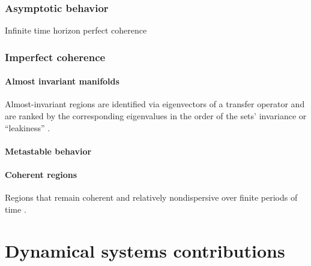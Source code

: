 \documentclass{article}
\theoremstyle{definition} \newtheorem{definition}{Definition}  \newtheorem{example}{Example}
\theoremstyle{remark} \newtheorem{remark}{Remark}
\newcounter{ct}
\begin{document}
\subsubsection{Asymptotic behavior}\label{sec:asymptotic}
Infinite time horizon perfect coherence





\subsubsection{Imperfect coherence}%
\paragraph{Almost invariant manifolds}
 Almost-invariant regions are identified via eigenvectors of a transfer operator and are ranked by the corresponding eigenvalues in the order of the sets' invariance or ``leakiness'' \citep{froyland2009almost}.
    
    
    
\paragraph{Metastable behavior}\label{sec:metastable}
   \citep{brinkman2022metastable}
    
    
\paragraph{Coherent regions}
Regions that remain coherent and relatively nondispersive over finite periods of time \citep{fackeldey2019metastable}.






\newpage
\section{Dynamical systems contributions}\label{sec:fojac}
\end{document}
